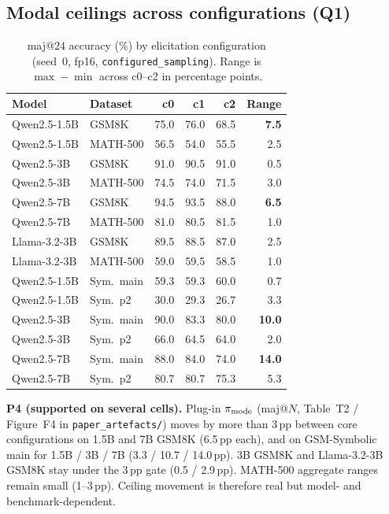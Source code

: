 \subsection{Modal ceilings across configurations (Q1)}
\label{sec:results-ceiling}

\begin{table}[t]
\centering
\caption{maj@$24$ accuracy (\%) by elicitation configuration (seed~0, fp16,
\texttt{configured\_sampling}). Range is $\max{-}\min$ across c0--c2 in
percentage points.}
\label{tab:main-acc}
\small
\begin{tabular}{llrrrr}
\toprule
Model & Dataset & c0 & c1 & c2 & Range \\
\midrule
Qwen2.5-1.5B & GSM8K & 75.0 & 76.0 & 68.5 & \textbf{7.5} \\
Qwen2.5-1.5B & MATH-500 & 56.5 & 54.0 & 55.5 & 2.5 \\
Qwen2.5-3B & GSM8K & 91.0 & 90.5 & 91.0 & 0.5 \\
Qwen2.5-3B & MATH-500 & 74.5 & 74.0 & 71.5 & 3.0 \\
Qwen2.5-7B & GSM8K & 94.5 & 93.5 & 88.0 & \textbf{6.5} \\
Qwen2.5-7B & MATH-500 & 81.0 & 80.5 & 81.5 & 1.0 \\
Llama-3.2-3B & GSM8K & 89.5 & 88.5 & 87.0 & 2.5 \\
Llama-3.2-3B & MATH-500 & 59.0 & 59.5 & 58.5 & 1.0 \\
\midrule
Qwen2.5-1.5B & Sym.\ main & 59.3 & 59.3 & 60.0 & 0.7 \\
Qwen2.5-1.5B & Sym.\ p2 & 30.0 & 29.3 & 26.7 & 3.3 \\
Qwen2.5-3B & Sym.\ main & 90.0 & 83.3 & 80.0 & \textbf{10.0} \\
Qwen2.5-3B & Sym.\ p2 & 66.0 & 64.5 & 64.0 & 2.0 \\
Qwen2.5-7B & Sym.\ main & 88.0 & 84.0 & 74.0 & \textbf{14.0} \\
Qwen2.5-7B & Sym.\ p2 & 80.7 & 80.7 & 75.3 & 5.3 \\
\bottomrule
\end{tabular}
\end{table}

\textbf{P4 (supported on several cells).}
 Plug-in $\pi_{\mathrm{mode}}$ (maj@$N$, Table~T2 /
Figure~F4 in \texttt{paper\_artefacts/}) moves by more than 3\,pp between core
configurations on 1.5B and 7B GSM8K (6.5\,pp each), and on GSM-Symbolic main for
1.5B / 3B / 7B (3.3 / 10.7 / 14.0\,pp). 3B GSM8K and Llama-3.2-3B GSM8K stay
under the 3\,pp gate (0.5 / 2.9\,pp). MATH-500 aggregate ranges remain small
(1--3\,pp). Ceiling movement is therefore real but model- and benchmark-dependent.

